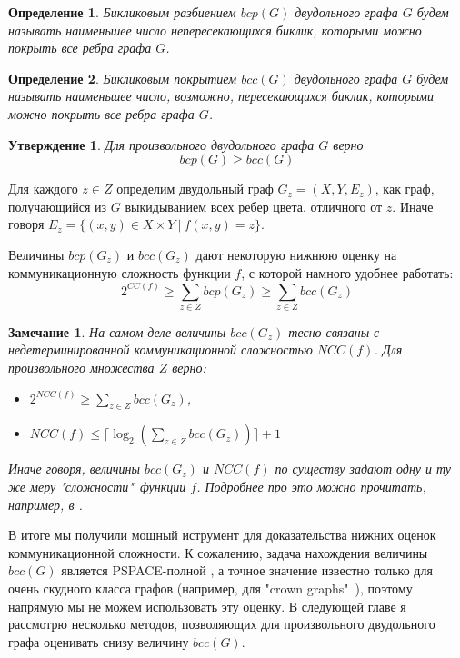 \documentclass[a4paper]{article}
\newtheorem*{mremark}{Замечание}
\newtheorem*{mdefinition}{Определение}
\newtheorem{mclaim}{Утверждение}[section]
\begin{document}
\begin{mdefinition}
	Бикликовым разбиением $bcp(G)$ двудольного графа $G$ будем называть наименьшее число непересекающихся
	биклик, которыми можно покрыть все ребра графа $G$.
\end{mdefinition}


\begin{mdefinition}
	Бикликовым покрытием $bcc(G)$ двудольного графа $G$ будем называть наименьшее число, возможно, 
	пересекающихся биклик, которыми можно покрыть все ребра графа $G$.
\end{mdefinition}

\begin{mclaim}
    Для произвольного двудольного графа $G$ верно $$bcp(G) \geq bcc(G)$$
\end{mclaim}

Для каждого $z \in Z$ определим двудольный граф $G_z = (X, Y, E_z)$, как граф, получающийся из $G$ 
выкидыванием всех ребер цвета, отличного от $z$. Иначе говоря $E_z = \{(x,y)\in X\times Y\ |\ f(x, y) = z \}$.

Величины $bcp(G_z)$ и $bcc(G_z)$ дают некоторую нижнюю оценку на коммуникационную сложность функции $f$, 
с которой намного удобнее работать: $$2^{CC(f)}\geq \sum\limits_{z\in Z}bcp(G_z)\geq \sum\limits_{z\in Z}bcc(G_z)$$

\begin{mremark}
    На самом деле величины $bcc(G_z)$ тесно связаны с недетерминированной коммуникационной сложностью 
    $NCC(f)$. Для произвольного множества $Z$ верно:
    \begin{itemize}[noitemsep]
        \item $2^{NCC(f)}\geq \sum\limits_{z\in Z}bcc(G_z)$,
        \item $NCC(f) \leq \lceil \log_2(\sum\limits_{z\in Z}bcc(G_z))\rceil + 1$
    \end{itemize}
    Иначе говоря, величины $bcc(G_z)$ и $NCC(f)$ по существу задают одну и ту же меру "сложности"\ функции $f$. 
    Подробнее про это можно прочитать, например, в \cite{Razborov}.
\end{mremark}

В итоге мы получили мощный иструмент для доказательства нижних оценок коммуникационной сложности. 
К сожалению, задача нахождения величины $bcc(G)$ является PSPACE-полной \cite{HermannMarkus}, а точное 
значение известно только для очень скудного класса графов (например, для "crown graphs"\ \cite{CrownGraph}), поэтому 
напрямую мы не можем использовать эту оценку. В следующей главе я рассмотрю несколько методов, 
позволяющих для произвольного двудольного графа оценивать снизу величину $bcc(G)$.
\end{document}
